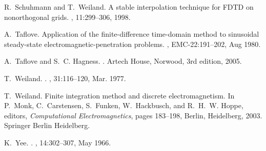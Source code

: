 \documentclass[12pt,reqno,a4paper]{amsart}
\theoremstyle{definition}
\begin{document}
\begin{thebibliography}{10}
R.~Schuhmann and T.~Weiland.
\newblock A stable interpolation technique for {FDTD} on nonorthogonal grids.
, 11:299--306, 1998.

A.~{Taflove}.
\newblock Application of the finite-difference time-domain method to sinusoidal
  steady-state electromagnetic-penetration problems.
,
  EMC-22:191--202, Aug 1980.

A.~Taflove and S.~C. Hagness.
.
\newblock Artech House, Norwood, 3rd edition, 2005.

T.~{Weiland}.
.
, 31:116--120, Mar.
  1977.

T.~Weiland.
\newblock Finite integration method and discrete electromagnetism.
\newblock In P.~Monk, C.~Carstensen, S.~Funken, W.~Hackbusch, and R.~H.~W.
  Hoppe, editors, {\em Computational Electromagnetics}, pages 183--198, Berlin,
  Heidelberg, 2003. Springer Berlin Heidelberg.

K.~{Yee}.
.
, 14:302--307, May
  1966.

\end{thebibliography}
\end{document}
